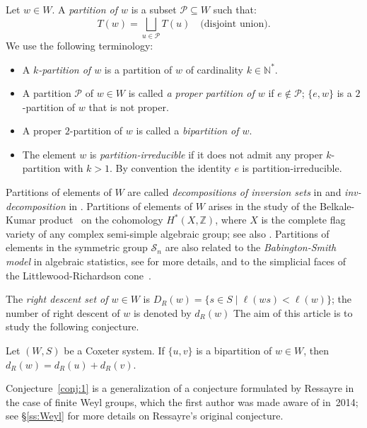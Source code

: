 \documentclass[ALCO,Unicode]{cedram}
\theoremstyle{definition}
\begin{document}
\begin{defi}\label{def:1} Let $w\in W$. A {\em partition of $w$} is a subset $\mathcal P\subseteq W$ such that:
$$
T(w)=\bigsqcup_{u\in \mathcal P} T(u) \quad\textrm{(disjoint union)}.
$$
We use the following terminology:
\begin{itemize}
\item A {\em $k$-partition of $w$} is a partition of $w$ of cardinality $k\in\mathbb N^*$. 
\item A partition $\mathcal P$ of $w\in W$ is called {\em a proper partition of $w$} if $e\notin \mathcal P$; $\{e,w\}$ is a $2$-partition of $w$ that is not proper.
\item A proper $2$-partition of $w$ is called a {\em bipartition of $w$}. 
\item The element $w$ is {\em partition-irreducible} if it does not admit any proper $k$-partition with $k>1$. By convention the identity $e$ is partition-irreducible. 
\end{itemize}
\end{defi}


Partitions of elements of $W$ are called {\em decompositions of inversion sets} in \cite{DeDiRo17} and {\em inv-decomposition} in \cite{Ka13}. Partitions of elements of $W$ arises in the study of the Belkale-Kumar product~\cite{BeKu06} on the cohomology $H^*(X,\mathbb Z)$, where $X$ is  the complete flag variety of any complex semi-simple algebraic group; see also \cite{DiRo09,DiRo17}. Partitions of elements in the symmetric group $\mathcal S_n$ are also related to the {\em Babington-Smith model} in algebraic statistics, see \cite{Ka13} for more details, and to the simplicial faces of the Littlewood-Richardson cone~\cite{DeDiRo17}.




 The {\em right descent set of $w\in W$} is $D_R(w)=\{s\in S \mid \ell(ws)<\ell(w)\}$; the number of right descent of $w$ is  denoted by $d_R(w)$  The aim of this article is to study the following conjecture. 

\begin{conj}\label{conj:1}  Let  $(W,S)$ be a Coxeter system. If  $\{u,v\}$ is a bipartition of $w\in W$, then $d_R(w)=d_R(u)+d_R(v)$. 
\end{conj}

Conjecture~\ref{conj:1} is a generalization of a conjecture formulated by Ressayre in the case of finite Weyl groups, which the first author was made aware of in~2014; see \S\ref{ss:Weyl} for more details on Ressayre's original conjecture.
\end{document}
